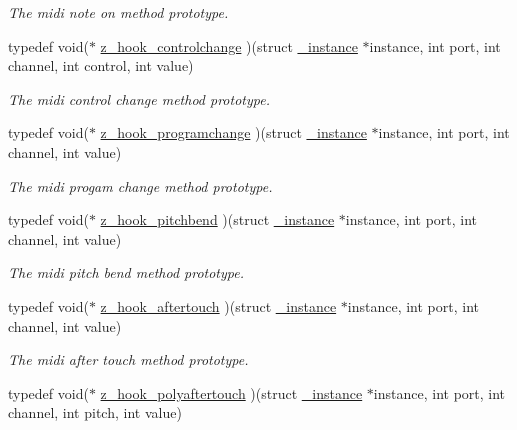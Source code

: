 \begin{DoxyCompactItemize}
\begin{DoxyCompactList}\small\item\em The midi note on method prototype. \end{DoxyCompactList}\item 
\hypertarget{group__zpd_ga1aea67cfcbc47b82082bb35e03e5b561}{typedef void($\ast$ \hyperlink{group__zpd_ga1aea67cfcbc47b82082bb35e03e5b561}{z\-\_\-hook\-\_\-controlchange} )(struct \hyperlink{struct__instance}{\-\_\-instance} $\ast$instance, int port, int channel, int control, int value)}\label{group__zpd_ga1aea67cfcbc47b82082bb35e03e5b561}

\begin{DoxyCompactList}\small\item\em The midi control change method prototype. \end{DoxyCompactList}\item 
\hypertarget{group__zpd_ga88e40eb2eaa5b504135ea679bde42073}{typedef void($\ast$ \hyperlink{group__zpd_ga88e40eb2eaa5b504135ea679bde42073}{z\-\_\-hook\-\_\-programchange} )(struct \hyperlink{struct__instance}{\-\_\-instance} $\ast$instance, int port, int channel, int value)}\label{group__zpd_ga88e40eb2eaa5b504135ea679bde42073}

\begin{DoxyCompactList}\small\item\em The midi progam change method prototype. \end{DoxyCompactList}\item 
\hypertarget{group__zpd_ga12ab6f5d74cb6d0852eeaf18f0698048}{typedef void($\ast$ \hyperlink{group__zpd_ga12ab6f5d74cb6d0852eeaf18f0698048}{z\-\_\-hook\-\_\-pitchbend} )(struct \hyperlink{struct__instance}{\-\_\-instance} $\ast$instance, int port, int channel, int value)}\label{group__zpd_ga12ab6f5d74cb6d0852eeaf18f0698048}

\begin{DoxyCompactList}\small\item\em The midi pitch bend method prototype. \end{DoxyCompactList}\item 
\hypertarget{group__zpd_gadc1545aa2d7f2ea07b430b9298ec2f9d}{typedef void($\ast$ \hyperlink{group__zpd_gadc1545aa2d7f2ea07b430b9298ec2f9d}{z\-\_\-hook\-\_\-aftertouch} )(struct \hyperlink{struct__instance}{\-\_\-instance} $\ast$instance, int port, int channel, int value)}\label{group__zpd_gadc1545aa2d7f2ea07b430b9298ec2f9d}

\begin{DoxyCompactList}\small\item\em The midi after touch method prototype. \end{DoxyCompactList}\item 
\hypertarget{group__zpd_ga35708c361dc10084ffeff19333bed883}{typedef void($\ast$ \hyperlink{group__zpd_ga35708c361dc10084ffeff19333bed883}{z\-\_\-hook\-\_\-polyaftertouch} )(struct \hyperlink{struct__instance}{\-\_\-instance} $\ast$instance, int port, int channel, int pitch, int value)}\label{group__zpd_ga35708c361dc10084ffeff19333bed883}


\end{DoxyCompactItemize}

